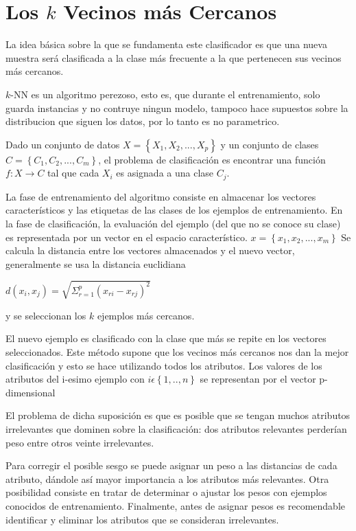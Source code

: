 \documentclass[11pt,letterpaper, reqno]{article}
\begin{document}
\section{Los $k$ Vecinos más Cercanos}

La idea básica sobre la que se fundamenta este clasificador es que una nueva muestra será clasificada a la clase más frecuente a la que pertenecen sus vecinos más cercanos.

$k$-NN es un algoritmo perezoso, esto es, que durante el entrenamiento, solo guarda instancias y no contruye ningun modelo, tampoco hace supuestos sobre la distribucion que siguen los datos, por lo tanto es no parametrico.

Dado un conjunto de datos $ X= \left\lbrace X_1,X_2, ... , X_p \right\rbrace $ y un conjunto de clases $ C= \left\lbrace C_1,C_2, ... , C_m \right\rbrace $, el  problema de clasificación es encontrar una función $ f:X \longrightarrow C $ tal que cada $ X_i $ es asignada a una clase $ C_j $.

La fase de entrenamiento del algoritmo consiste en almacenar los vectores característicos y las etiquetas de las clases de los ejemplos de entrenamiento.  En la fase de clasificación, la evaluación del ejemplo (del que no se conoce su clase) es representada por un vector en el espacio característico.
$ x = \left\lbrace x_1,x_2, ... , x_m \right\rbrace $
Se calcula la distancia entre los vectores almacenados y el nuevo vector, generalmente se usa la distancia euclidiana

\begin{center}
$ d(x_i,x_j)=\sqrt{\Sigma_{r=1}^{p} (x_{ri}-x_{rj})^2} $
\end{center}
y se seleccionan los $ k $ ejemplos más cercanos.

El nuevo ejemplo es clasificado con la clase que más se repite en los vectores seleccionados. Este método supone que los vecinos más cercanos nos dan la mejor clasificación y esto se hace utilizando todos los atributos. Los valores de los atributos del i-esimo ejemplo con $ i \epsilon \left\lbrace 1, .. , n \right\rbrace $ se representan por el vector p-dimensional

El problema de dicha suposición es que es posible que se tengan muchos atributos irrelevantes que dominen sobre la clasificación: dos atributos relevantes perderían peso entre otros veinte irrelevantes.

Para corregir el posible sesgo se puede asignar un peso a las distancias de cada atributo, dándole así mayor importancia a los atributos más relevantes. Otra posibilidad consiste en tratar de determinar o ajustar los pesos con ejemplos conocidos de entrenamiento. Finalmente, antes de asignar pesos es recomendable identificar y eliminar los atributos que se consideran irrelevantes.
\end{document}
